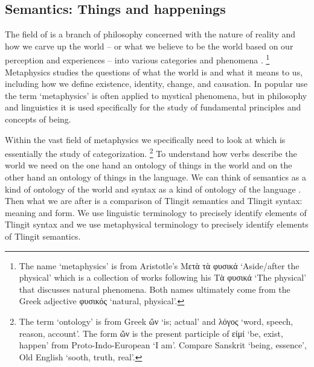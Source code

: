 




\subsection{Semantics: Things and happenings}\label{sec:intro-ling-sem}


The field of  is a branch of philosophy concerned with the nature of reality and how we carve up the world – or what we believe to be the world based on our perception and experiences – into various  categories and phenomena \parencite{van-inwagen-sullivan:2015}.%
\footnote{The name ‘metaphysics’ is from Aristotle’s Μετὰ τὰ φυσικά  ‘Aside/after the physical’ which is a collection of works following his Τὰ φυσικά  ‘The physical’ that discusses natural phenomena. Both names ultimately come from the Greek adjective φυσικός  ‘natural, physical’.}
Metaphysics studies the questions of what the world is and what it means to us, including how we define existence, identity, change, and causation.
In popular use the term ‘metaphysics’ is often applied to mystical phenomena, but in philosophy and linguistics it is used specifically for the study of fundamental principles and concepts of being.

Within the vast field of metaphysics we specifically need to look at  which is essentially the study of categorization.%
\footnote{The term ‘ontology’ is from Greek ὤν  ‘is; actual’ and λόγος  ‘word, speech, reason, account’. The form ὤν  is the present participle of εἰμί  ‘be, exist, happen’ from Proto-Indo-European  ‘I am’. Compare Sanskrit  ‘being, essence’, Old English  ‘sooth, truth, real’.}
To understand how verbs describe the world we need on the one hand an ontology of things in the world and on the other hand an ontology of things in the language.
We can think of semantics as a kind of ontology of the world and syntax as a kind of ontology of the language  \parencites{montague:1969}.
Then what we are after is a comparison of Tlingit semantics and Tlingit syntax: meaning and form.
We use linguistic terminology to precisely identify elements of Tlingit syntax and we use metaphysical terminology to precisely identify elements of Tlingit semantics.

